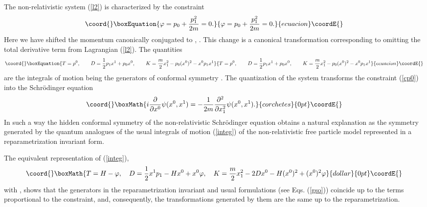 \documentclass[a4paper,12pt]{article}
\begin{document}
The non-relativistic system
(\ref{l2}) is characterized by the
constraint
\begin{equation}\coord{}\boxEquation{
\varphi=p_0+\frac{p_1^2}{2m}=0.
\label{cp0}
}{
\varphi=p_0+\frac{p_1^2}{2m}=0.
}{ecuacion}\coordE{}\end{equation}
Here we have shifted the momentum \coordHE{}
canonically conjugated to \coordHE{},
\coordHE{}.
This change is a canonical transformation
corresponding to omitting
the
total derivative term \coordHE{}
from Lagrangian (\ref{l2}).
The quantities
\begin{equation}\coord{}\boxEquation{
T=p^0,\qquad D=\frac{1}{2}p_1x^1+p_0x^0,\qquad
K=\frac{m}{2}x_1^2-p_0(x^0)^2-x^0p_1x^1
\label{integ}
}{
T=p^0,\qquad D=\frac{1}{2}p_1x^1+p_0x^0,\qquad
K=\frac{m}{2}x_1^2-p_0(x^0)^2-x^0p_1x^1
}{ecuacion}\coordE{}\end{equation}
are the integrals of motion being the generators
of conformal symmetry \coordHE{}.
The quantization of the system
transforms the constraint (\ref{cp0})
into the Schr\"odinger
equation
\[\coord{}\boxMath{
i\frac{\partial}{\partial x^0}\psi(x^0,x^1)=
-\frac{1}{2m}\frac{\partial^2}{\partial x_1^2}
\psi(x^0,x^1).
}{corchetes}{0pt}\coordE{}\]
In
such a way the hidden conformal symmetry of the
non-relativistic Schr\"odinger
equation \cite{BaRa}
obtains a
natural explanation as the symmetry
generated by the quantum
analogues of the usual integrals of motion
(\ref{integ})
of the non-relativistic free particle model
represented in a reparametrization invariant form.

The  equivalent representation of (\ref{integ}),
$$\coord{}\boxMath{
T=H-\varphi,\quad
D=\frac{1}{2}x^1p_1-Hx^0+x^0\varphi,\quad
K=\frac{m}{2}x_1^2-2Dx^0-H(x^0)^2+(x^0)^2\varphi
}{dollar}{0pt}\coordE{}$$
with \coordHE{},
shows that the
\coordHE{} generators in the
reparametrization
invariant
and usual formulations (see Eqs. (\ref{gso}))
coincide up to the terms proportional to the constraint,
and, consequently,
the transformations generated by them
are the same up to the reparametrization.
\end{document}
